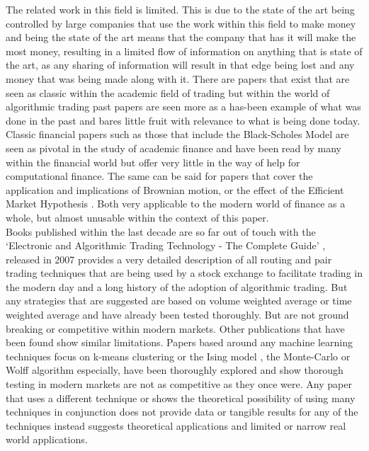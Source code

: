 \documentclass[conference]{IEEEtran}
\begin{document}
\iffalse
The related work in this field is limited. This is due to the state of the art being controlled by large companies that use the work within this field to make money and being the state of the art means that the company that has it will make the most money, resulting in a limited flow of information on anything that is state of the art, as any sharing of information will result in that edge being lost and any money that was being made along with it. There are papers that exist that are seen as classic within the academic field of trading but within the world of algorithmic trading past papers are seen more as a has-been example of what was done in the past and bares little fruit with relevance to what is being done today. \\

Classic financial papers such as those that include the Black-Scholes Model \cite{Saad2015} are seen as pivotal in the study of academic finance and have been read by many within the financial world but offer very little in the way of help for computational finance. The same can be said for papers that cover the application and implications of Brownian motion, or the effect of the Efficient Market Hypothesis \cite{Meng2016}. Both very applicable to the modern world of finance as a whole, but almost unusable within the context of this paper. \\

Books published within the last decade are so far out of touch with the `Electronic and Algorithmic Trading Technology - The Complete Guide' \cite{Kim2007}, released in 2007 provides a very detailed description of all routing and pair trading techniques that are being used by a stock exchange to facilitate trading in the modern day and a long history of the adoption of algorithmic trading. But any strategies that are suggested are based on volume weighted average or time weighted average and have already been tested thoroughly. But are not ground breaking or competitive within modern markets. Other publications that have been found show similar limitations. Papers based around any machine learning techniques focus on k-means clustering \cite{Gerlein2016} or the Ising model \cite{Lima2017}, the Monte-Carlo or Wolff algorithm especially, have been thoroughly explored and show thorough testing in modern markets are not as competitive as they once were. Any paper that uses a different technique or shows the theoretical possibility of using many techniques in conjunction does not provide data or tangible results for any of the techniques instead suggests theoretical applications and limited or narrow real world applications.\\
\end{document}
